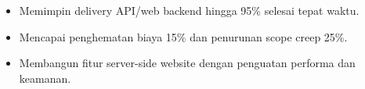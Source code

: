 \begin{itemize}
\item Memimpin delivery API/web backend hingga 95\% selesai tepat waktu.
\item Mencapai penghematan biaya 15\% dan penurunan scope creep 25\%.
\end{itemize}
\divider

\begin{itemize}
\item Membangun fitur server-side website dengan penguatan performa dan keamanan.
\end{itemize}

\newpage
\switchcolumn
